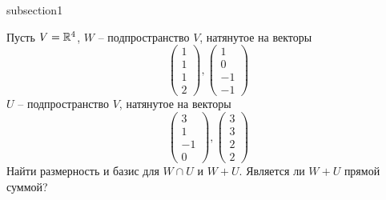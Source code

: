 subsection{1}

Пусть $ V = \mathbb{R}^4 $, $ W $ -- подпространство $ V $, натянутое на векторы
$$
\begin{pmatrix}
	1 \\
    1 \\
    1 \\
    2
\end{pmatrix},
\begin{pmatrix}
	1 \\
    0 \\
    -1 \\
    -1
\end{pmatrix} $$
$ U $ -- подпространство $ V $, натянутое на векторы
$$
\begin{pmatrix}
	3 \\
    1 \\
    -1 \\
    0
\end{pmatrix},
\begin{pmatrix}
	3 \\
    3 \\
    2 \\
    2
\end{pmatrix} $$
Найти размерность и базис для $ W \cap U $ и $ W + U $. Является ли $ W + U $ прямой суммой?

